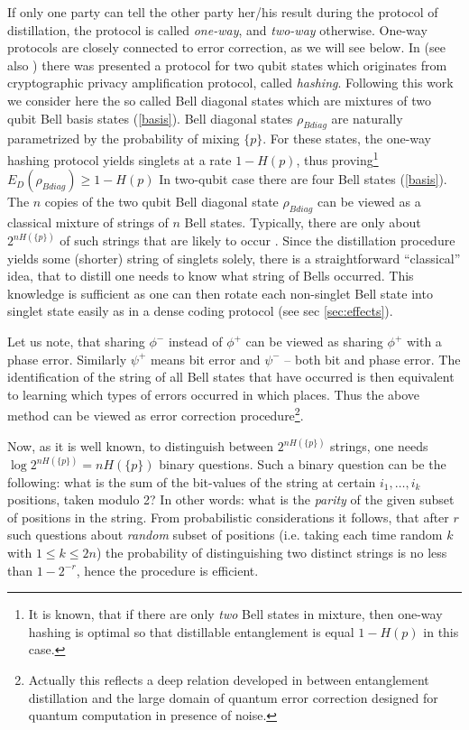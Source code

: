 \documentclass[twocolumn,aps,rmp]{revtex4}
\begin{document}
If only one party can tell the other party her/his result during the
protocol of distillation, the protocol is called {\it one-way}, and
{\it two-way} otherwise. One-way protocols are closely connected to
error correction, as we will see below. In \cite{BDSW1996} (see also
\cite{BBPSSW1996}) there was presented a protocol for two qubit states
which originates from cryptographic privacy amplification protocol,
called {\it hashing}. Following this work we consider here the so
called Bell diagonal states which are mixtures of two qubit Bell basis
states (\ref{basis}).  Bell diagonal states $\rho_{Bdiag}$ are
naturally parametrized by the probability of mixing $\{p\}$.  For
these states, the one-way hashing protocol yields singlets at a rate
$1-H(p)$, thus proving\footnote{It is known, that if there are only
  {\it two} Bell states in mixture, then one-way hashing is optimal so
  that distillable entanglement is equal $1-H(p)$ in this case.}
$E_D(\rho_{Bdiag})\geq 1-H(p)$ In two-qubit case there are four Bell
states (\ref{basis}). The $n$ copies of the two qubit Bell diagonal
state $\rho_{Bdiag}$ can be viewed as a classical mixture of strings
of $n$ Bell states.  Typically, there are only about $2^{nH(\{p\})}$
of such strings that are likely to occur \cite{CoverThomas}. Since the
distillation procedure yields some (shorter) string of singlets
solely, there is a straightforward ``classical'' idea, that to distill
one needs to know what string of Bells occurred. This knowledge is
sufficient as one can then rotate each non-singlet Bell state into
singlet state easily as in a dense coding protocol (see sec
\ref{sec:effects}).

Let us note, that sharing $\phi^-$ instead of  $\phi^+$
can be viewed as sharing $\phi^+$ with a phase error. Similarly $\psi^+$ means bit error and $\psi^-$
--  both bit and phase error.
 The identification of
the string of all Bell states that have occurred is then equivalent to
learning which types of errors occurred in which places. Thus the
above method can be viewed as error correction
procedure\footnote{Actually this reflects a deep relation developed in
  \cite{BDSW1996} between entanglement distillation and the large
  domain of quantum error correction designed for quantum computation
  in presence of noise.}.

Now, as it is well known, to distinguish between $2^{nH(\{p\})}$
strings, one needs $\log 2^{nH(\{p\})} = nH(\{p\})$ binary
questions. Such a binary question can be the following: what is the
sum of the bit-values of the string at certain $i_1,\ldots,i_k$
positions, taken modulo 2? In other words: what is the {\it parity} of
the given subset of positions in the string. From probabilistic
considerations it follows, that after $r$ such questions about {\it
  random} subset of positions (i.e.  taking each time random $k$ with
$1\leq k\leq 2n$) the probability of distinguishing two distinct
strings is no less than $1-2^{-r}$, hence the procedure is efficient.
\end{document}
